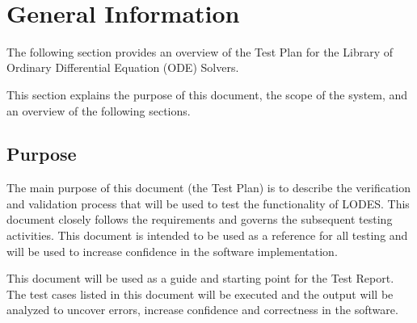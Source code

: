 \documentclass[12pt, titlepage]{article}
\newcommand{\famname}{LODES} %
\begin{document}
~\newpage

\tableofcontents

\listoftables


\newpage



\section{General Information}
The following section provides an overview of the Test Plan for the Library of Ordinary Differential Equation (ODE) 
Solvers.\\  

This section explains the purpose of this document, the scope of the system, and an overview of the following 
sections.


\subsection{Purpose}
The main purpose of this document (the Test Plan) is to describe the verification and validation process that will 
be used to test the functionality of \famname{}.  This document closely follows the requirements and governs
the subsequent testing activities. This document is intended to be used as a reference for all testing and will be
used to increase confidence in the 
software implementation.  

This document will be used as a guide and starting point for the Test Report. The test cases
listed in this document will be executed and the output will be analyzed to uncover errors, increase confidence 
and correctness in the software.
\end{document}

